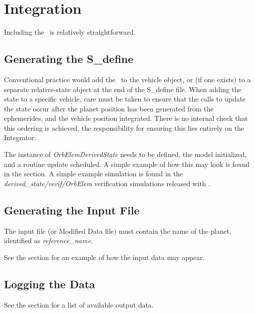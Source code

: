 %
%
% 
%


 \section{Integration}

Including the \OrbElemDesc\ is relatively straightforward.

 \subsection{Generating the S\_define}

Conventional practice would add the \OrbElemDesc\ to the vehicle object, or (if one exists) to a separate relative-state object at the end of the S\_define file.  When adding the state to a specific vehicle, care must be taken to ensure that the calls to update the state occur after the planet position has been generated from the ephemerides, and the vehicle position integrated.  There is no internal check that this ordering is achieved, the responsibility for ensuring this lies entirely on the Integrator.

The instance of \textit{OrbElemDerivedState} needs to be defined, the model initialized, and a routine update scheduled.  A simple example of how this may look is found in the  section.  A simple example simulation is found in the 
\textit{derived\_state/verif/OrbElem} verification simulations released with \JEODid.

\subsection{Generating the Input File}
The input file (or Modified Data file) must contain the name of the planet, identified as \textit{reference\_name}.

See the  section for an example of how the input data may appear.

\subsection{Logging the Data}
See the  section for a list of available output data.
